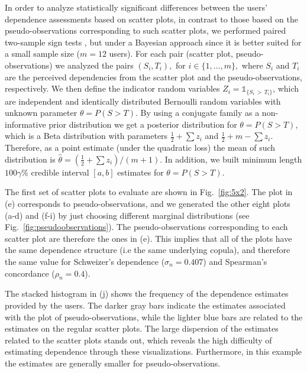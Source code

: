 \documentclass[journal]{vgtc}                %
\begin{document}
In order to analyze statistically significant differences between the users' dependence assessments based on scatter plots, in contrast to those based on the pseudo-observations corresponding to such scatter plots, we performed paired two-sample sign tests \cite{Mood1974}, but under a Bayesian approach \cite{Bernardo1994} since it is better suited for a small sample size ($m=12$ users). For each pair (scatter plot, pseudo-observations) we analyzed the pairs $(S_i,T_i),$ for $i\in\{1,\ldots,m\},$ where $S_i$ and $T_i$ are the perceived dependencies from the scatter plot and the pseudo-observations, respectively. We then define the indicator random variables $Z_i=\mathbb{1}_{\{S_i\,>\,T_i\}}$, which are independent and identically distributed Bernoulli random variables with unknown parameter $\theta=P(S>T).$ By using a conjugate family as a non-informative prior distribution we get a posterior distribution for $\theta=P(S>T)$, which is a Beta distribution with parameters $\frac{1}{2}+\sum z_i$ and $\frac{1}{2}+m-\sum z_i$. Therefore, as a point estimate (under the quadratic loss) the mean of such distribution is $\hat{\theta}=(\frac{1}{2}+\sum z_i)/(m+1).$ In addition, we built minimum length $100\gamma\%$ credible interval $[a,b]$ estimates for $\theta=P(S>T).$

The first set of scatter plots to evaluate are shown in Fig.~\ref{fig:5x2}. The plot in (e) corresponds to pseudo-observations, and we generated the other eight plots (a-d) and (f-i) by just choosing different marginal distributions (see Fig.~\ref{fig:pseudoobservations}). The pseudo-observations corresponding to each scatter plot are therefore the ones in (e). This implies that all of the plots have the same dependence structure (i.e the same underlying copula), and therefore the same value for Schweizer's dependence ($\sigma_{n} = 0.407$) and Spearman's concordance ($\rho_{n} = 0.4$). 

The stacked histogram in (j) shows the frequency of the dependence estimates provided by the users. The darker gray bars indicate the estimates associated with the plot of pseudo-observations, while the lighter blue bars are related to the estimates on the regular scatter plots. The large dispersion of the estimates related to the scatter plots stands out, which reveals the high difficulty of estimating dependence through these visualizations. Furthermore, in this example the estimates are generally smaller for pseudo-observations.
\end{document}
